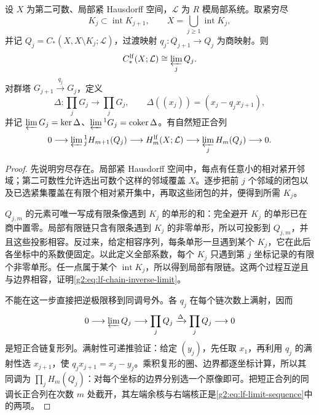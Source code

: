 \begin{proposition}\label{g2:prop:locally-finite-limit}
	设 \(X\) 为第二可数、局部紧 Hausdorff 空间，\(\mathcal L\) 为 \(R\) 模局部系统。取紧穷尽
	\[
		K_j\subset\operatorname{int}K_{j+1},\qquad
		X=\bigcup_{j\ge1}\operatorname{int}K_j,
	\]
	并记 \(Q_j=C_*(X,X\setminus K_j;\mathcal L)\)，过渡映射 \(q_j:Q_{j+1}\to Q_j\) 为商映射。则
	\begin{equation}\label{g2:eq:lf-chain-inverse-limit}
		C_*^{\mathrm{lf}}(X;\mathcal L)\cong\varprojlim_j Q_j.
	\end{equation}
	对群塔 \(G_{j+1}\xrightarrow{q_j}G_j\)，定义
	\[
		\Delta:\prod_jG_j\longrightarrow\prod_jG_j,
		\qquad\Delta((x_j))=(x_j-q_jx_{j+1}),
	\]
	并记 \(\varprojlim G_j=\ker\Delta\)、\(\varprojlim{}^1G_j=\operatorname{coker}\Delta\)。有自然短正合列
	\begin{equation}\label{g2:eq:lf-limit-sequence}
		0\longrightarrow\varprojlim{}^1_j H_{m+1}(Q_j)
		\longrightarrow H_m^{\mathrm{lf}}(X;\mathcal L)
		\longrightarrow\varprojlim_j H_m(Q_j)\longrightarrow0.
	\end{equation}
\end{proposition}
\begin{proof}
	先说明穷尽存在。局部紧 Hausdorff 空间中，每点有任意小的相对紧开邻域；第二可数性允许选出可数个这样的邻域覆盖 \(X\)。逐步把前 \(j\) 个邻域的闭包以及已选紧集覆盖在有限个相对紧开集中，再取这些闭包的并，便得到所需 \(K_j\)。

	\(Q_{j,m}\) 的元素可唯一写成有限条像遇到 \(K_j\) 的单形的和：完全避开 \(K_j\) 的单形已在商中置零。局部有限链只含有限条遇到 \(K_j\) 的非零单形，所以可投影到 \(Q_{j,m}\)，并且这些投影相容。反过来，给定相容序列，每条单形一旦遇到某个 \(K_j\)，它在此后各坐标中的系数便固定。以此定义全部系数，每个 \(K_j\) 只遇到第 \(j\) 坐标记录的有限个非零单形。任一点属于某个 \(\operatorname{int}K_j\)，所以得到局部有限链。这两个过程互逆且与边界相容，证明\eqref{g2:eq:lf-chain-inverse-limit}。

	不能在这一步直接把逆极限移到同调号外。各 \(q_j\) 在每个链次数上满射，因而
	\[
		0\longrightarrow\varprojlim Q_j\longrightarrow\prod_jQ_j
		\xrightarrow{\Delta}\prod_jQ_j\longrightarrow0
	\]
	是短正合链复形列。满射性可递推验证：给定 \((y_j)\)，先任取 \(x_1\)，再利用 \(q_j\) 的满射性选 \(x_{j+1}\)，使 \(q_jx_{j+1}=x_j-y_j\)。乘积复形的圈、边界都逐坐标计算，所以其同调为 \(\prod_jH_m(Q_j)\)：对每个坐标的边界分别选一个原像即可。把短正合列的同调长正合列在次数 \(m\) 处截开，其左端余核与右端核正是\eqref{g2:eq:lf-limit-sequence}中的两项。
\end{proof}

